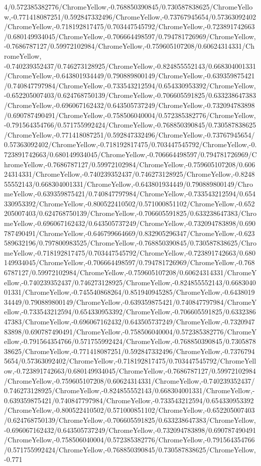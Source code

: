 {\begin{tikzternal}
{4/0.572385382776/ChromeYellow,-0.768850390845/0.730587838625/ChromeYellow,-0.771418087251/0.592847332496/ChromeYellow,-0.73767945654/0.57363092402/ChromeYellow,-0.718192817475/0.703447545792/ChromeYellow,-0.723891742663/0.680149934045/ChromeYellow,-0.706664498597/0.794781726969/ChromeYellow,-0.7686787127/0.59972102984/ChromeYellow,-0.759605107208/0.60624314331/ChromeYellow,
-0.740239352437/0.746273128925/ChromeYellow,-0.824855552143/0.668304001331/ChromeYellow,-0.643801934449/0.790889800149/ChromeYellow,-0.639359875421/0.740847797984/ChromeYellow,-0.733543212594/0.654330953392/ChromeYellow,-0.652205007403/0.624768750139/ChromeYellow,-0.706605591825/0.633238647383/ChromeYellow,-0.696067162432/0.643505737249/ChromeYellow,-0.732094783898/0.690787490491/ChromeYellow,-0.758506040004/0.572385382776/ChromeYellow,-0.791564354766/0.571755992424/ChromeYellow,-0.768850390845/0.730587838625/ChromeYellow,-0.771418087251/0.592847332496/ChromeYellow,-0.73767945654/0.57363092402/ChromeYellow,-0.718192817475/0.703447545792/ChromeYellow,-0.723891742663/0.680149934045/ChromeYellow,-0.706664498597/0.794781726969/ChromeYellow,-0.7686787127/0.59972102984/ChromeYellow,-0.759605107208/0.60624314331/ChromeYellow,-0.740239352437/0.746273128925/ChromeYellow,-0.824855552143/0.668304001331/ChromeYellow,-0.643801934449/0.790889800149/ChromeYellow,-0.639359875421/0.740847797984/ChromeYellow,-0.733543212594/0.654330953392/ChromeYellow,-0.800522410502/0.571000851102/ChromeYellow,-0.652205007403/0.624768750139/ChromeYellow,-0.706605591825/0.633238647383/ChromeYellow,-0.696067162432/0.643505737249/ChromeYellow,-0.732094783898/0.690787490491/ChromeYellow,-0.646799664669/0.832905296347/ChromeYellow,-0.623589632196/0.797800983525/ChromeYellow,-0.768850390845/0.730587838625/ChromeYellow,-0.718192817475/0.703447545792/ChromeYellow,-0.723891742663/0.680149934045/ChromeYellow,-0.706664498597/0.794781726969/ChromeYellow,-0.7686787127/0.59972102984/ChromeYellow,-0.759605107208/0.60624314331/ChromeYellow,-0.740239352437/0.746273128925/ChromeYellow,-0.824855552143/0.668304001331/ChromeYellow,-0.745540868264/0.851940945285/ChromeYellow,-0.643801934449/0.790889800149/ChromeYellow,-0.639359875421/0.740847797984/ChromeYellow,-0.733543212594/0.654330953392/ChromeYellow,-0.706605591825/0.633238647383/ChromeYellow,-0.696067162432/0.643505737249/ChromeYellow,-0.732094783898/0.690787490491/ChromeYellow,-0.758506040004/0.572385382776/ChromeYellow,-0.791564354766/0.571755992424/ChromeYellow,-0.768850390845/0.730587838625/ChromeYellow,-0.771418087251/0.592847332496/ChromeYellow,-0.73767945654/0.57363092402/ChromeYellow,-0.718192817475/0.703447545792/ChromeYellow,-0.723891742663/0.680149934045/ChromeYellow,-0.7686787127/0.59972102984/ChromeYellow,-0.759605107208/0.60624314331/ChromeYellow,-0.740239352437/0.746273128925/ChromeYellow,-0.824855552143/0.668304001331/ChromeYellow,-0.639359875421/0.740847797984/ChromeYellow,-0.733543212594/0.654330953392/ChromeYellow,-0.800522410502/0.571000851102/ChromeYellow,-0.652205007403/0.624768750139/ChromeYellow,-0.706605591825/0.633238647383/ChromeYellow,-0.696067162432/0.643505737249/ChromeYellow,-0.732094783898/0.690787490491/ChromeYellow,-0.758506040004/0.572385382776/ChromeYellow,-0.791564354766/0.571755992424/ChromeYellow,-0.768850390845/0.730587838625/ChromeYellow,-0.771}
\end{tikzternal}}
